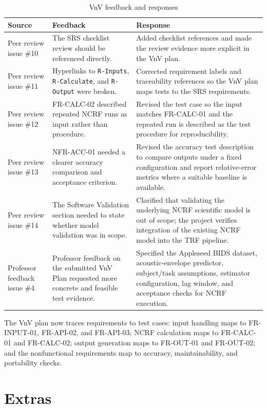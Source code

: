 \documentclass{article}
\begin{document}
\begin{table}[H]
\centering
\begin{tabularx}{\textwidth}{p{} p{} X}
\toprule
\textbf{Source} & \textbf{Feedback} & \textbf{Response}\\
\midrule
Peer review issue \#10 & The SRS checklist review should be referenced directly. & Added checklist references and made the review evidence more explicit in the VnV plan.\\
Peer review issue \#11 & Hyperlinks to \texttt{R-Inputs}, \texttt{R-Calculate}, and \texttt{R-Output} were broken. & Corrected requirement labels and traceability references so the VnV plan maps tests to the SRS requirements.\\
Peer review issue \#12 & FR-CALC-02 described repeated NCRF runs as input rather than procedure. & Revised the test case so the input matches FR-CALC-01 and the repeated run is described as the test procedure for reproducibility.\\
Peer review issue \#13 & NFR-ACC-01 needed a clearer accuracy comparison and acceptance criterion. & Revised the accuracy test description to compare outputs under a fixed configuration and report relative-error metrics where a suitable baseline is available.\\
Peer review issue \#14 & The Software Validation section needed to state whether model validation was in scope. & Clarified that validating the underlying NCRF scientific model is out of scope; the project verifies integration of the existing NCRF model into the TRF pipeline.\\
Professor feedback issue \#4 & Professor feedback on the submitted VnV Plan requested more concrete and feasible test evidence. & Specified the Appleseed BIDS dataset, acoustic-envelope predictor, subject/task assumptions, estimator configuration, lag window, and acceptance checks for NCRF execution.\\
\bottomrule
\end{tabularx}
\caption{VnV feedback and responses}
\end{table}

The VnV plan now traces requirements to test cases: input handling maps to FR-INPUT-01, FR-API-02, and FR-API-03; NCRF calculation maps to FR-CALC-01 and FR-CALC-02; output generation maps to FR-OUT-01 and FR-OUT-02; and the nonfunctional requirements map to accuracy, maintainability, and portability checks.

\section{Extras}
\end{document}
